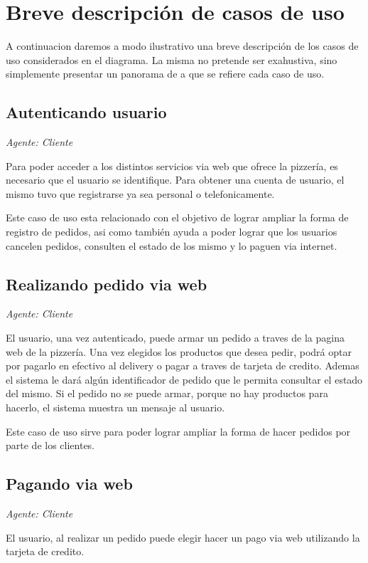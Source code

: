 \section{Breve descripción de casos de uso}
A continuacion daremos a modo ilustrativo una breve descripción de los casos de uso 
considerados en el diagrama. La misma no pretende ser exahustiva, sino simplemente presentar 
un panorama de a que se refiere cada caso de uso.

\setcounter{subsection}{0}
\subsection{Autenticando usuario}

\textit{Agente: Cliente}

Para poder acceder a los distintos servicios via web que ofrece la pizzería, es necesario 
que el usuario se identifique. Para obtener una cuenta de usuario, el mismo tuvo que 
registrarse ya sea personal o telefonicamente.

Este caso de uso esta relacionado con el objetivo de lograr ampliar la forma de registro de 
pedidos, asi como también ayuda a poder lograr que los usuarios cancelen pedidos, consulten 
el estado de los mismo y lo paguen via internet.

\subsection{Realizando pedido via web}

\textit{Agente: Cliente}

El usuario, una vez autenticado, puede armar un pedido a traves de la pagina web de la 
pizzería. Una vez elegidos los productos que desea pedir, podrá optar por pagarlo en 
efectivo al delivery o pagar a traves de tarjeta de credito. Ademas el sistema le dará algún 
identificador de pedido que le permita consultar el estado del mismo. Si el pedido no se 
puede armar, porque no hay productos para hacerlo, el sistema muestra un mensaje al usuario.

Este caso de uso sirve para poder lograr ampliar la forma de hacer pedidos por parte de los 
clientes.

\subsection{Pagando via web}

\textit{Agente: Cliente}

El usuario, al realizar un pedido puede elegir hacer un pago via web utilizando la tarjeta 
de credito.


